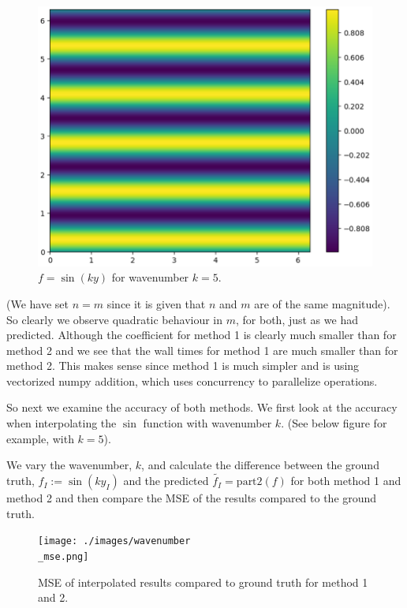\documentclass[a4paper, oneside]{book}
\begin{document}
\begin{figure}[htpb]
    \centering
    \includegraphics[width=1.0\textwidth]{./images/sin_k5.png}
    \caption{$f = \sin(ky)$ for wavenumber $k = 5$.}
\end{figure}

(We have set $n = m$ since it is given that $n$ and $m$ are of the same magnitude). So clearly we
observe quadratic behaviour in $m$, for both, just as we had predicted. Although the coefficient for method 1 is clearly much smaller than for method 2 and we see
that the wall times for method 1 are much smaller than for method 2. This makes
sense since method 1 is much simpler and is using vectorized numpy addition, which
uses concurrency to parallelize operations.


So next we examine the accuracy of both methods.
We first look at the accuracy when interpolating the $\sin$ function with wavenumber $k$.
(See below figure for example, with $k = 5$).

\clearpage

We vary the wavenumber, $k$, and calculate the difference between the ground truth, $f_I := \sin(ky_I)$ 
and the predicted $\tilde{f_I} = \text{part2}(f)$ for both method 1 and method 2 and then
compare the MSE of the results compared to the ground truth. 

\begin{figure}[htpb]
    \centering
    \texttt{[image: ./images/wavenumber\\\_mse.png]}
    \caption{MSE of interpolated results compared to ground truth for method 1 and 2.}
\end{figure}
\end{document}
